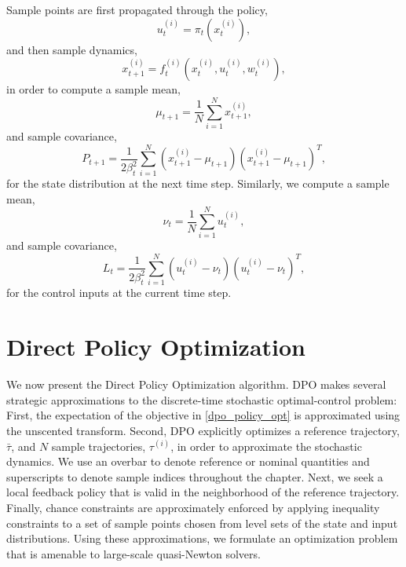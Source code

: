Sample points are first propagated through the policy,
\begin{equation}
	u_t^{(i)} = \pi_t(x_t^{(i)}), \label{dpo_sample_propagate_control}
\end{equation}
and then sample dynamics,
\begin{equation}
	x_{t+1}^{(i)} = f_t^{(i)}(x_t^{(i)}, u_t^{(i)}, w_t^{(i)}), \label{dpo_sample_propagate}
\end{equation}
in order to compute a sample mean,
\begin{equation}
	\mu_{t+1} = \frac{1}{N} \sum\limits_{i=1}^{N} x_{t+1}^{(i)}, \label{dpo_sample_mean}
\end{equation}
and sample covariance,
\begin{equation}
	P_{t+1} = \frac{1}{2 \beta_t^2}\sum\limits_{i=1}^{N} (x_{t+1}^{(i)} - \mu_{t+1})(x_{t+1}^{(i)} - \mu_{t+1})^T, \label{dpo_sample_covariance}
\end{equation}
for the state distribution at the next time step. Similarly, we compute a sample mean,
\begin{equation}
	\nu_t = \frac{1}{N} \sum\limits_{i=1}^{N} u_t^{(i)}, \label{dpo_sample_mean_control}
\end{equation}
and sample covariance,
\begin{equation}
	L_t = \frac{1}{2 \beta_t^2}\sum\limits_{i=1}^{N} (u_t^{(i)} - \nu_t)(u_t^{(i)} - \nu_t)^T, \label{dpo_sample_covariance_control}
\end{equation}
for the control inputs at the current time step.

\section{Direct Policy Optimization}\label{DPO}
We now present the Direct Policy Optimization algorithm. DPO makes several strategic approximations to the discrete-time stochastic optimal-control problem: First, the expectation of the objective in \eqref{dpo_policy_opt} is approximated using the unscented transform. Second, DPO explicitly optimizes a reference trajectory, $\bar{\tau}$, and $N$ sample trajectories, $\tau^{(i)}$, in order to approximate the stochastic dynamics. We use an overbar to denote reference or nominal quantities and superscripts to denote sample indices throughout the chapter. Next, we seek a local feedback policy that is valid in the neighborhood of the reference trajectory. Finally, chance constraints are approximately enforced by applying inequality constraints to a set of sample points chosen from level sets of the state and input distributions. Using these approximations, we formulate an optimization problem that is amenable to large-scale quasi-Newton solvers.

